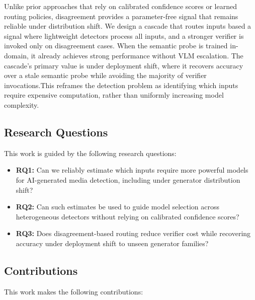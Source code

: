 \documentclass{ieeeaccess}
\begin{document}
Unlike prior approaches that rely on calibrated confidence scores or learned routing policies, disagreement provides a parameter-free signal that remains reliable under distribution shift. We design a cascade that routes inputs based a signal where lightweight detectors process all inputs, and a stronger verifier is invoked only on disagreement cases. When the semantic probe is trained in-domain, it already achieves strong performance without VLM escalation. The cascade's primary value is under deployment shift, where it recovers
accuracy over a stale semantic probe while avoiding the majority of verifier invocations.This reframes the detection problem as identifying which inputs require expensive computation, rather than uniformly increasing model complexity.

\subsection{Research Questions}

This work is guided by the following research questions:

\begin{itemize}
    \item \textbf{RQ1:} Can we reliably estimate which inputs require more powerful models
    for AI-generated media detection, including under generator distribution shift?
    \item \textbf{RQ2:} Can such estimates be used to guide model selection across heterogeneous detectors without relying on calibrated confidence scores?
    \item \textbf{RQ3:} Does disagreement-based routing reduce verifier cost while recovering accuracy under deployment shift to unseen generator families?
\end{itemize}

\subsection{Contributions}

This work makes the following contributions:
\end{document}
